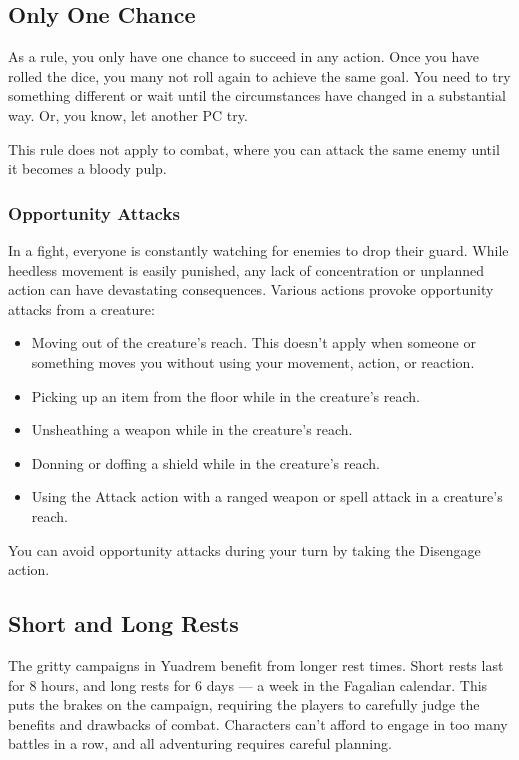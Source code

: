 \subsection*{Only One Chance} \label{ssec::onlyonechance}
    As a rule, you only have one chance to succeed in any action.
    Once you have rolled the dice, you many not roll again to achieve the same goal.
    You need to try something different or wait until the circumstances have changed in a substantial way.
    Or, you know, let another PC try.

    This rule does not apply to combat, where you can attack the same enemy until it becomes a bloody pulp.

\subsubsection*{Opportunity Attacks} \label{rule::opportunityattacks}
    In a fight, everyone is constantly watching for enemies to drop their guard.
    While heedless movement is easily punished, any lack of concentration or unplanned action can have devastating consequences.
    Various actions provoke opportunity attacks from a creature:
    \begin{itemize}
        \item Moving out of the creature's reach.
        This doesn't apply when someone or something moves you without using your movement, action, or reaction.
        \item Picking up an item from the floor while in the creature's reach.
        \item Unsheathing a weapon while in the creature's reach.
        \item Donning or doffing a shield while in the creature's reach.
        \item Using the Attack action with a ranged weapon or spell attack in a creature's reach.
    \end{itemize}
    You can avoid opportunity attacks during your turn by taking the Disengage action.

\subsection*{Short and Long Rests} \label{ssec::shortandlongrests}
    The gritty campaigns in Yuadrem benefit from longer rest times.
    Short rests last for 8 hours, and long rests for 6 days --- a week in the Fagalian calendar.
    This puts the brakes on the campaign, requiring the players to carefully judge the benefits and drawbacks of combat.
    Characters can't afford to engage in too many battles in a row, and all adventuring requires careful planning.

